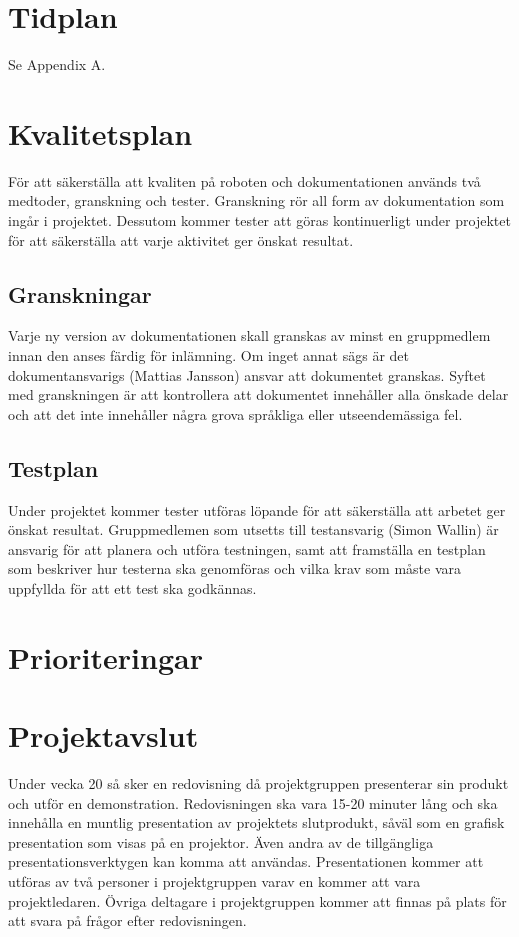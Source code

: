 \documentclass[a4paper,12pt]{article}
\begin{document}
\section{Tidplan}
Se  Appendix A.


\section{Kvalitetsplan}	%
För att säkerställa att kvaliten på roboten och dokumentationen används två medtoder, granskning och tester. Granskning rör all form av dokumentation som ingår i projektet. Dessutom kommer tester att göras kontinuerligt under projektet för att säkerställa att varje aktivitet ger önskat resultat.
\subsection{Granskningar}
Varje ny version av dokumentationen skall granskas av minst en gruppmedlem innan den anses färdig för inlämning. Om inget annat sägs är det dokumentansvarigs (Mattias Jansson) ansvar att dokumentet granskas. Syftet med granskningen är att kontrollera att dokumentet innehåller alla önskade delar och att det inte innehåller några grova språkliga eller utseendemässiga fel.

\subsection{Testplan}
Under projektet kommer tester utföras löpande för att säkerställa att arbetet ger önskat resultat. Gruppmedlemen som utsetts till testansvarig (Simon Wallin) är ansvarig för att planera och utföra testningen, samt att framställa en testplan som beskriver hur testerna ska genomföras och vilka krav som måste vara uppfyllda för att ett test ska godkännas.



\section{Prioriteringar}


\section{Projektavslut} %

Under vecka 20 så sker en redovisning då projektgruppen presenterar sin produkt och utför en demonstration. Redovisningen ska vara 15-20 minuter lång och ska innehålla en muntlig presentation av projektets slutprodukt, såväl som en grafisk presentation som visas på en projektor. Även andra av de tillgängliga presentationsverktygen kan komma att användas. Presentationen kommer att utföras av två personer i projektgruppen varav en kommer att vara projektledaren. Övriga deltagare i projektgruppen kommer att finnas på plats för att svara på frågor efter redovisningen.
\end{document}
